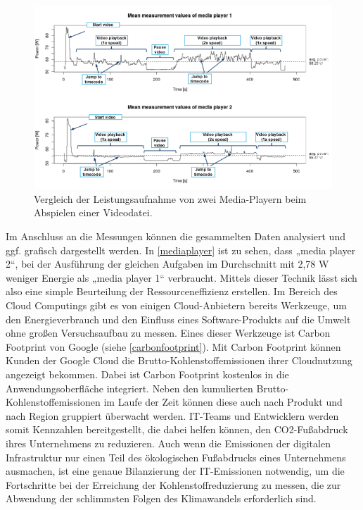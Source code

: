 \documentclass[utf8,biblatex]{lni}
\begin{document}
\begin{figure}[ht]
\centering
\includegraphics[width=1.1\linewidth]{Mediaplayer.png}
\caption{{\centering 
Vergleich der Leistungsaufnahme von zwei Media-Playern beim Abspielen einer Videodatei. \cite{Guldner22}
}}
\label{mediaplayer}
\end{figure}
Im Anschluss an die Messungen können die gesammelten Daten analysiert und ggf. grafisch dargestellt werden. In \autoref{mediaplayer} ist zu sehen, dass „media player 2“, bei der Ausführung der gleichen Aufgaben im Durchschnitt mit 2,78 W weniger Energie als „media player 1“ verbraucht. Mittels dieser Technik lässt sich also eine simple Beurteilung der Ressourceneffizienz erstellen. \cite{Guldner22}
\newline
\newline
Im Bereich des Cloud Computings gibt es von einigen Cloud-Anbietern bereits Werkzeuge, um den Energieverbrauch und den Einfluss eines Software-Produkts auf die Umwelt ohne großen Versuchsaufbau zu messen. Eines dieser Werkzeuge ist Carbon Footprint von Google (siehe \autoref{carbonfootprint}). Mit Carbon Footprint können Kunden der Google Cloud die Brutto-Kohlenstoffemissionen ihrer Cloudnutzung angezeigt bekommen. Dabei ist Carbon Footprint kostenlos in die Anwendungsoberfläche integriert. Neben den kumulierten Brutto-Kohlenstoffemissionen im Laufe der Zeit können diese auch nach Produkt und nach Region gruppiert überwacht werden. IT-Teams und Entwicklern werden somit Kennzahlen bereitgestellt, die dabei helfen können, den CO2-Fußabdruck ihres Unternehmens zu reduzieren. Auch wenn die Emissionen der digitalen Infrastruktur nur einen Teil des ökologischen Fußabdrucks eines Unternehmens ausmachen, ist eine genaue Bilanzierung der IT-Emissionen notwendig, um die Fortschritte bei der Erreichung der Kohlenstoffreduzierung zu messen, die zur Abwendung der schlimmsten Folgen des Klimawandels erforderlich sind. \cite{Talbott21}
\end{document}
